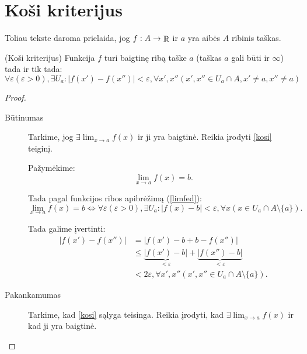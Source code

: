 \section{Koši kriterijus}

\begin{note}
  Toliau tekste daroma prielaida, jog $f: A \to \mathop{\mathbb{R}}$ ir $a$ yra 
  aibės $A$ ribinis taškas.
\end{note}

\begin{prop}
  (Koši kriterijus) Funkcija $f$ turi baigtinę ribą taške $a$
  (taškas $a$ gali būti ir $\infty$) tada ir tik tada:
  \begin{equation}
    \forall \varepsilon (\varepsilon > 0), \exists U_{a} :
    | f(x') - f(x'') | < \varepsilon,
    \forall x', x'' (x',x'' \in U_{a} \cap A, x' \neq a, x'' \neq a)
    \label{kosi}
  \end{equation}

  \begin{proof}
    \hfill \\
    \begin{description}
      \item[Būtinumas] Tarkime, jog $\exists \lim _{x \to a} f(x)$ ir ji
        yra baigtinė. Reikia įrodyti \ref{kosi} teiginį.

        Pažymėkime:
        \begin{equation*}
          \lim _{x \to a} f(x) = b.
        \end{equation*}

        Tada pagal funkcijos ribos apibrėžimą (\ref{limfed}):
        \begin{equation*}
          \lim _{x \to a} f(x) = b \iff 
          \forall \varepsilon (\varepsilon > 0), \exists U_{a}:
          | f(x) - b | < \varepsilon, 
          \forall x (x \in U_{a} \cap A \setminus \{a\}).
        \end{equation*}

        Tada galime įvertinti:
        \begin{align*}
          | f(x') - f(x'') | &= | f(x') - b + b - f(x'') | \\
          &\leq \underbrace{| f(x') - b |}_{ < \varepsilon } +
          \underbrace{| f(x'') - b |}_{ < \varepsilon } \\
          &< 2 \varepsilon, \forall x',x'' 
          (x',x'' \in U_{a} \cap A \setminus \{a\}).
        \end{align*}

      \item[Pakankamumas] Tarkime, kad \ref{kosi} sąlyga teisinga. Reikia 
        įrodyti, kad $\exists \lim _{x \to a} f(x)$ ir kad ji yra baigtinė.


\end{description}
\end{proof}
\end{prop}
